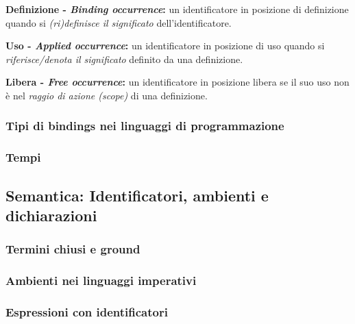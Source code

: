 \documentclass[a4paper]{article}
\begin{document}
	\noindent
	\begin{boxdef}
		\textcolor{Red3}{\textbf{Definizione - \emph{Binding occurrence}:}} un identificatore in posizione di definizione quando si \emph{(ri)definisce il significato} dell'identificatore.
	\end{boxdef}\:\newline

	\noindent
	\begin{boxdef}
		\textcolor{Red3}{\textbf{Uso - \emph{Applied occurrence}:}} un identificatore in posizione di uso quando si \emph{riferisce/denota il significato} definito da una definizione.
	\end{boxdef}\:\newline
	
	\noindent
	\begin{boxdef}
		\textcolor{Red3}{\textbf{Libera - \emph{Free occurrence}:}} un identificatore in posizione libera se il suo uso non è nel \emph{raggio di azione (scope)} di una definizione.
	\end{boxdef}\newpage
	
	
	
	\subsubsection{Tipi di bindings nei linguaggi di programmazione}
	
	\subsubsection{Tempi}
	
	\subsection{Semantica: Identificatori, ambienti e dichiarazioni}
	
	\subsubsection{Termini chiusi e ground}
	
	\subsubsection{Ambienti nei linguaggi imperativi}
	
	\subsubsection{Espressioni con identificatori}
	
\end{document}
